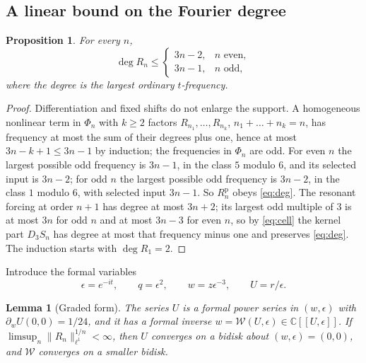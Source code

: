 \documentclass[11pt]{amsart}
\numberwithin{equation}{section}
\newtheorem{proposition}[theorem]{Proposition}
\newtheorem{lemma}[theorem]{Lemma}
\theoremstyle{definition}
\theoremstyle{remark}
\newcommand{\C}{\mathbb{C}}
\newcommand{\norm}[1]{\lVert #1\rVert}
\begin{document}
\subsection{A linear bound on the Fourier degree}

\begin{proposition}\label{prop:degree}
For every $n$,
\begin{equation}\label{eq:deg}
\deg R_n\le\begin{cases}3n-2,&n\text{ even},\\3n-1,&n\text{ odd},\end{cases}
\end{equation}
where the degree is the largest ordinary $t$-frequency.
\end{proposition}

\begin{proof}
Differentiation and fixed shifts do not enlarge the support. A homogeneous nonlinear term in $\Phi_n$ with $k\ge2$ factors $R_{n_1},\dots,R_{n_k}$, $n_1+\dots+n_k=n$, has frequency at most the sum of their degrees plus one, hence at most $3n-k+1\le3n-1$ by induction; the frequencies in $\Phi_n$ are odd. For even $n$ the largest possible odd frequency is $3n-1$, in the class $5$ modulo $6$, and its selected input is $3n-2$; for odd $n$ the largest possible odd frequency is $3n-2$, in the class $1$ modulo $6$, with selected input $3n-1$. So $R_n^{\mathrm p}$ obeys \eqref{eq:deg}. The resonant forcing at order $n+1$ has degree at most $3n+2$; its largest odd multiple of $3$ is at most $3n$ for odd $n$ and at most $3n-3$ for even $n$, so by \eqref{eq:cell} the kernel part $D_3S_n$ has degree at most that frequency minus one and preserves \eqref{eq:deg}. The induction starts with $\deg R_1=2$.
\end{proof}

Introduce the formal variables
\begin{equation}\label{eq:graded}
\epsilon=e^{-it},\qquad q=\epsilon^2,\qquad w=z\epsilon^{-3},\qquad U=r/\epsilon .
\end{equation}

\begin{lemma}[Graded form]\label{lem:graded}
The series $U$ is a formal power series in $(w,\epsilon)$ with $\partial_wU(0,0)=1/24$, and it has a formal inverse $w=\mathcal W(U,\epsilon)\in\C[[U,\epsilon]]$. If $\limsup_n\norm{R_n}_{\ell^1}^{1/n}<\infty$, then $U$ converges on a bidisk about $(w,\epsilon)=(0,0)$, and $\mathcal W$ converges on a smaller bidisk.
\end{lemma}
\end{document}
